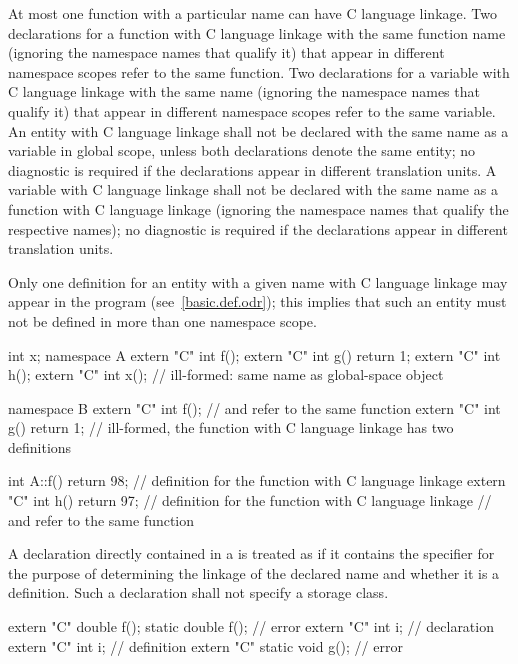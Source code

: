 \pnum
{}%
At most one function with a particular name can have C language linkage.
Two declarations for a function with C language linkage with the same
function name (ignoring the namespace names that qualify it) that appear
in different namespace scopes refer to the same function. Two
declarations for a variable with C language linkage with the same name
(ignoring the namespace names that qualify it) that appear in different
namespace scopes refer to the same variable.
An entity with C language linkage shall not be declared with the same name
as a variable in global scope, unless both declarations denote the same entity;
no diagnostic is required if the declarations appear in different translation units.
A variable with C language linkage shall not be declared with the same name as a
function with C language linkage (ignoring the namespace names that qualify the
respective names); no diagnostic is required if the declarations appear in
different translation units.
\begin{note}
Only
one definition for an entity with a given name
with C language linkage may appear in the
program (see~\ref{basic.def.odr});
this implies that such an entity
must not be defined in more
than one namespace scope.\end{note}
\begin{example}

\begin{codeblock}
int x;
namespace A {
  extern "C" int f();
  extern "C" int g() { return 1; }
  extern "C" int h();
  extern "C" int x();               // ill-formed: same name as global-space object 
}

namespace B {
  extern "C" int f();               //  and  refer to the same function
  extern "C" int g() { return 1; }  // ill-formed, the function  with C language linkage has two definitions
}

int A::f() { return 98; }           // definition for the function  with C language linkage
extern "C" int h() { return 97; }   // definition for the function  with C language linkage
                                    //  and  refer to the same function
\end{codeblock}
\end{example}

\pnum
A declaration directly contained in a
is treated as if it contains the
specifier for the purpose of determining the linkage of the
declared name and whether it is a definition. Such a declaration shall
not specify a storage class.
\begin{example}

\begin{codeblock}
extern "C" double f();
static double f();                  // error
extern "C" int i;                   // declaration
extern "C" {
  int i;                            // definition
}
extern "C" static void g();         // error
\end{codeblock}
\end{example}


